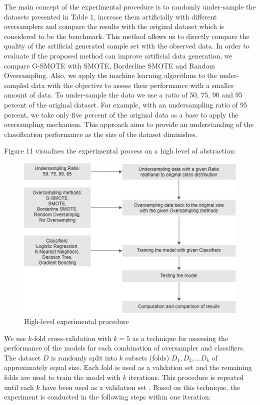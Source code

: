 \documentclass[parskip=full]{scrartcl}
\begin{document}
The main concept of the experimental procedure is to randomly under-sample 
the datasets presented in Table 1, increase them artificially with different 
oversamplers and compare the results with the original dataset which is 
considered to be the benchmark. This method allows us to directly compare the 
quality of the artificial generated sample set with the observed data. In order 
to evaluate if the proposed method can improve artificial data generation, we 
compare G-SMOTE with SMOTE, Borderline SMOTE and Random Oversampling. Also, we 
apply the machine learning algorithms to the under-sampled data with the 
objective to assess their performance with a smaller amount of data. To 
under-sample the data we use a ratio of 50, 75, 90 and 95 percent of the 
original dataset. For example, with an undersampling ratio of 95 percent, we 
take only five percent of the original data as a base to apply the oversampling 
mechanism. This approach aims to provide an understanding of the classification 
performance as the size of the dataset diminishes.

Figure 11 visualizes the experimental process on a high level of abstraction: 

\begin{figure}[H]
	\centering
	\includegraphics[width=0.7\linewidth]{../analysis/experimental_procedure}
	\caption{High-level experimental procedure}
	\label{fig:experimentalprocedure}
\end{figure}


We use \( k \)-fold cross-validation with \( k = 5 \) as a technique 
for assessing the performance of the models for each combination of oversampler 
and classifiers. The dataset \( D \) is randomly split into \( k \) 
subsets (folds) \( D_1, D_2, … D_k \) of approximately equal size. Each 
fold is used as a validation set and the remaining folds are used to train the 
model with \( k \) iterations. This procedure is repeated until each 
\( k \) have been used as a validation set \cite{Han.2012}. Based on this 
technique, the experiment is conducted in the following steps within one 
iteration:
\end{document}
